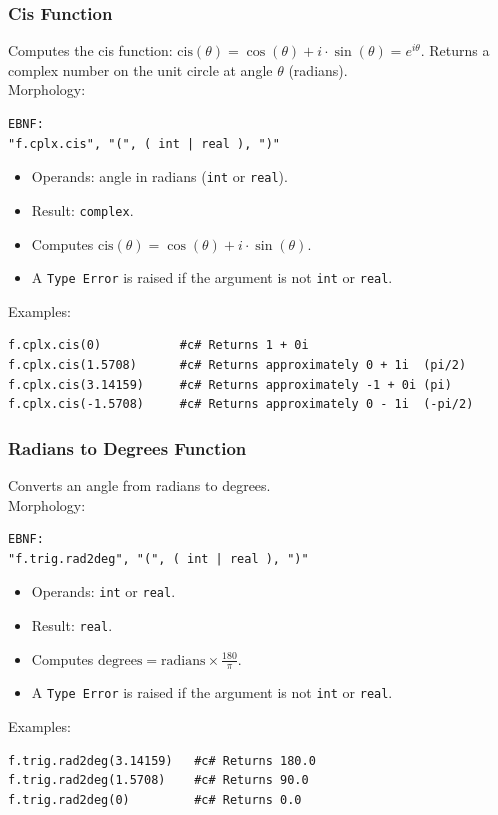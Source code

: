 \subsubsection{Cis Function}
Computes the cis function: $\text{cis}(\theta) = \cos(\theta) + i \cdot \sin(\theta) = e^{i\theta}$. Returns a complex number on the unit circle at angle $\theta$ (radians). \\
Morphology:
\begin{verbatim}
EBNF:
"f.cplx.cis", "(", ( int | real ), ")"
\end{verbatim}
\begin{itemize}
\item Operands: angle in radians (\texttt{int} or \texttt{real}).
\item Result: \texttt{complex}.
\item Computes $\text{cis}(\theta) = \cos(\theta) + i \cdot \sin(\theta)$.
\item A \texttt{Type Error} is raised if the argument is not \texttt{int} or \texttt{real}.
\end{itemize}
Examples:
\begin{verbatim}
f.cplx.cis(0)           #c# Returns 1 + 0i
f.cplx.cis(1.5708)      #c# Returns approximately 0 + 1i  (pi/2)
f.cplx.cis(3.14159)     #c# Returns approximately -1 + 0i (pi)
f.cplx.cis(-1.5708)     #c# Returns approximately 0 - 1i  (-pi/2)
\end{verbatim}

\subsubsection{Radians to Degrees Function}
Converts an angle from radians to degrees. \\
Morphology:
\begin{verbatim}
EBNF:
"f.trig.rad2deg", "(", ( int | real ), ")"
\end{verbatim}
\begin{itemize}
\item Operands: \texttt{int} or \texttt{real}.
\item Result: \texttt{real}.
\item Computes $\text{degrees} = \text{radians} \times \frac{180}{\pi}$.
\item A \texttt{Type Error} is raised if the argument is not \texttt{int} or \texttt{real}.
\end{itemize}
Examples:
\begin{verbatim}
f.trig.rad2deg(3.14159)   #c# Returns 180.0
f.trig.rad2deg(1.5708)    #c# Returns 90.0
f.trig.rad2deg(0)         #c# Returns 0.0
\end{verbatim}

